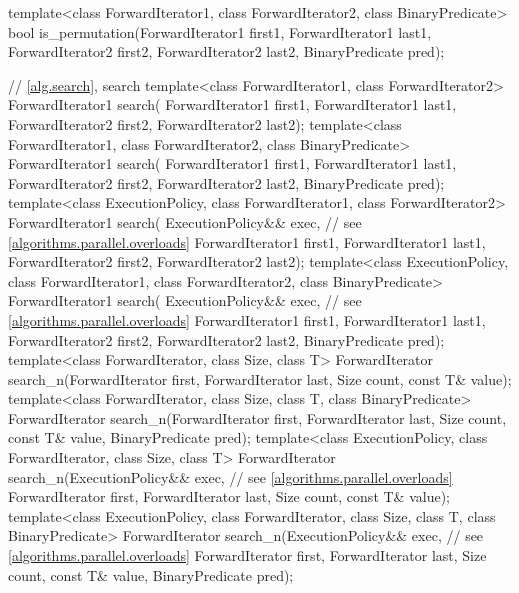 \begin{codeblock}
{  template<class ForwardIterator1, class ForwardIterator2, class BinaryPredicate>
    bool is_permutation(ForwardIterator1 first1, ForwardIterator1 last1,
                        ForwardIterator2 first2, ForwardIterator2 last2,
                        BinaryPredicate pred);

  // \ref{alg.search}, search
  template<class ForwardIterator1, class ForwardIterator2>
    ForwardIterator1 search(
      ForwardIterator1 first1, ForwardIterator1 last1,
      ForwardIterator2 first2, ForwardIterator2 last2);
  template<class ForwardIterator1, class ForwardIterator2, class BinaryPredicate>
    ForwardIterator1 search(
      ForwardIterator1 first1, ForwardIterator1 last1,
      ForwardIterator2 first2, ForwardIterator2 last2,
      BinaryPredicate pred);
  template<class ExecutionPolicy, class ForwardIterator1, class ForwardIterator2>
    ForwardIterator1 search(
      ExecutionPolicy&& exec, // see \ref{algorithms.parallel.overloads}
      ForwardIterator1 first1, ForwardIterator1 last1,
      ForwardIterator2 first2, ForwardIterator2 last2);
  template<class ExecutionPolicy, class ForwardIterator1, class ForwardIterator2,
           class BinaryPredicate>
    ForwardIterator1 search(
      ExecutionPolicy&& exec, // see \ref{algorithms.parallel.overloads}
      ForwardIterator1 first1, ForwardIterator1 last1,
      ForwardIterator2 first2, ForwardIterator2 last2,
      BinaryPredicate pred);
  template<class ForwardIterator, class Size, class T>
    ForwardIterator search_n(ForwardIterator first, ForwardIterator last,
                             Size count, const T& value);
  template<class ForwardIterator, class Size, class T, class BinaryPredicate>
    ForwardIterator search_n(ForwardIterator first, ForwardIterator last,
                             Size count, const T& value,
                             BinaryPredicate pred);
  template<class ExecutionPolicy, class ForwardIterator, class Size, class T>
    ForwardIterator search_n(ExecutionPolicy&& exec, // see \ref{algorithms.parallel.overloads}
                             ForwardIterator first, ForwardIterator last,
                             Size count, const T& value);
  template<class ExecutionPolicy, class ForwardIterator, class Size, class T,
           class BinaryPredicate>
    ForwardIterator search_n(ExecutionPolicy&& exec, // see \ref{algorithms.parallel.overloads}
                             ForwardIterator first, ForwardIterator last,
                             Size count, const T& value,
                             BinaryPredicate pred);

}
\end{codeblock}
